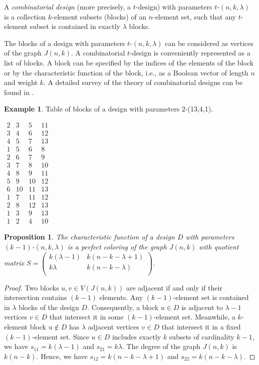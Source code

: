 \documentclass[11pt]{article}
\newtheorem{claim}{Proposition}[section]
\theoremstyle{definition}
\newtheorem{example}{Example}[section]
\begin{document}
{{{%
A {\sl combinatorial design} (more precisely,
a $t$-design) with parameters $t$-$(n,k,\lambda)$
 is a collection  $k$-element
subsets (blocks) of an $n$-element set, such that any $t$-element
subset is contained in exactly $\lambda$ blocks.

The blocks of a design with parameters $t$-$(n,k,\lambda)$ can be considered
as vertices of the graph $J(n,k)$. A combinatorial $t$-design is conveniently
represented as a list of blocks. A block can be specified by the
indices of the elements of the block or by the characteristic function of the block, i.e.,
as a Boolean vector of length $n$ and weight $k$. A detailed survey of the theory
of combinatorial designs can be found in \cite{CDinitz}.

\begin{example} Table of blocks of a design with parameters 2-(13,4,1).

$\begin{array}{cccc}
  2 & 3 & 5 & 11\\
  3 & 4 & 6 & 12\\
  4 & 5 & 7 & 13\\
  1 & 5 & 6 & 8\\
  2 & 6 & 7 & 9\\
  3 & 7 & 8 & 10\\
  4 & 8 & 9 & 11\\
  5 & 9 & 10 & 12\\
  6 & 10 & 11 & 13\\
  1 & 7 & 11 & 12\\
  2 & 8 & 12 & 13\\
  1 & 3 & 9 & 13\\
  1 & 2 & 4 & 10
\end{array}$
\end{example}

\begin{claim}\label{c:design1}
The characteristic function of a design $D$ with parameters
$(k-1)$-$(n,k,\lambda)$
 is a perfect coloring of the graph
$J(n,k)$ with quotient matrix $S=\left(\begin{array}{cc}
k(\lambda-1)& k(n-k-\lambda+1) \\
k\lambda&  k(n-k-\lambda)\\
\end{array} \right)$.
\end{claim}
\begin{proof}
 Two blocks $u,v\in V(J(n,k))$ are adjacent if and only
if their intersection contains $(k-1)$ elements. Any
$(k-1)$-element set is contained in $\lambda$ blocks of the design
$D$. Consequently,
 a block $u\in D$ is adjacent to $\lambda-1$ vertices $v\in D$ that intersect
   it in some $(k-1)$-element
set. Meanwhile, a $k$-element block $u\not \in D$ has
$\lambda$ adjacent vertices $v\in D$ that intersect
   it in a fixed $(k-1)$-element
set. Since  $u\in D$ includes exactly $k$ subsets
of cardinality $k-1$, we have $s_{11}=k(\lambda-1)$ and $s_{21}=k\lambda$.
The degree of the graph $J(n,k)$ is $k(n-k)$. Hence, we have
$s_{12}=k(n-k-\lambda+1)$ and $s_{22}=k(n-k-\lambda)$.
\end{proof}

}}}
\end{document}
